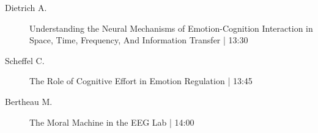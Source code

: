 \begin{symposium}
\begin{description}
                \item [ Dietrich A.] Understanding the Neural Mechanisms of Emotion-Cognition Interaction in Space, Time, Frequency, And Information Transfer \textcolor{mygray}{ | 13:30}    
                
                \item [ Scheffel C.] The Role of Cognitive Effort in Emotion Regulation \textcolor{mygray}{ | 13:45}    
                
                \item [ Bertheau M.] The Moral Machine in the EEG Lab \textcolor{mygray}{ | 14:00}    
                
            \end{description} 
            \end{symposium}
            